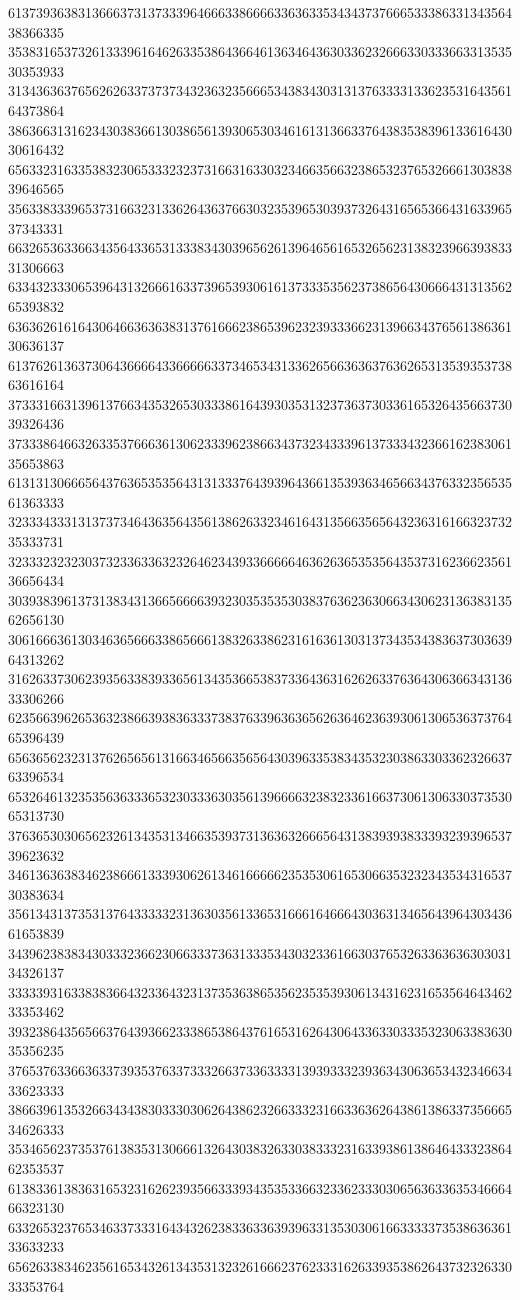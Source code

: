 61373936383136663731373339646663386666336363353434373766653338633134356438366335
35383165373261333961646263353864366461363464363033623266633033366331353530353933
31343636376562626337373734323632356665343834303131376333313362353164356164373864
38636631316234303836613038656139306530346161313663376438353839613361643030616432
65633231633538323065333232373166316330323466356632386532376532666130383839646565
35633833396537316632313362643637663032353965303937326431656536643163396537343331
66326536336634356433653133383430396562613964656165326562313832396639383331306663
63343233306539643132666163373965393061613733353562373865643066643131356265393832
63636261616430646636363831376166623865396232393336623139663437656138636130636137
61376261363730643666643366666337346534313362656636363763626531353935373863616164
37333166313961376634353265303338616439303531323736373033616532643566373039326436
37333864663263353766636130623339623866343732343339613733343236616238306135653863
61313130666564376365353564313133376439396436613539363465663437633235653561363333
32333433313137373464363564356138626332346164313566356564323631616632373235333731
32333232323037323363363232646234393366666463626365353564353731623662356136656434
30393839613731383431366566663932303535353038376362363066343062313638313562656130
30616663613034636566633865666138326338623161636130313734353438363730363964313262
31626337306239356338393365613435366538373364363162626337636430636634313633306266
62356639626536323866393836333738376339636365626364623639306130653637376465396439
65636562323137626565613166346566356564303963353834353230386330336232663763396534
65326461323535636333653230333630356139666632383233616637306130633037353065313730
37636530306562326134353134663539373136363266656431383939383339323939653739623632
34613636383462386661333930626134616666623535306165306635323234353431653730383634
35613431373531376433333231363035613365316661646664303631346564396430343661653839
34396238383430333236623066333736313335343032336166303765326336363630303134326137
33333931633838366432336432313735363865356235353930613431623165356464346233353462
39323864356566376439366233386538643761653162643064336330333532306338363035356235
37653763366363373935376337333266373363333139393332393634306365343234663433623333
38663961353266343438303330306264386232663332316633636264386138633735666534626333
35346562373537613835313066613264303832633038333231633938613864643332386462353537
61383361383631653231626239356633393435353366323362333030656363363534666466323130
63326532376534633733316434326238336336393963313530306166333337353863636133633233
65626338346235616534326134353132326166623762333162633935386264373232633033353764
